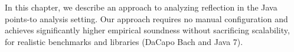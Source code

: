 In this chapter, we describe an approach to analyzing reflection in the
Java points-to analysis setting.
%
%
Our approach requires no manual configuration and achieves
significantly higher empirical soundness without sacrificing
scalability, for realistic benchmarks and libraries (DaCapo Bach and
Java 7).
%
%
